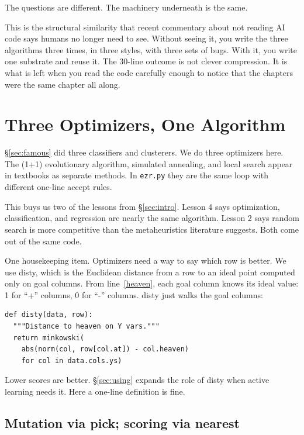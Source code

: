 \documentclass[AMA,STIX2COL]{WileyNJDv5}
\begin{document}
The questions are different. The machinery underneath is the
same.

This is the structural similarity that recent commentary about
not reading AI code says humans no longer need to see. Without
seeing it, you write the three algorithms three times, in three
styles, with three sets of bugs. With it, you write one
substrate and reuse it. The 30-line outcome is not clever
compression. It is what is left when you read the code
carefully enough to notice that the chapters were the same
chapter all along.

\section{Three Optimizers, One Algorithm}\label{sec:opt}

\S\ref{sec:famous} did three classifiers and clusterers. We do
three optimizers here. The (1+1) evolutionary algorithm,
simulated annealing, and local search appear in textbooks as
separate methods. In \texttt{ezr.py} they are the same loop
with different one-line accept rules.

This buys us two of the lessons from \S\ref{sec:intro}. Lesson 4
says optimization, classification, and regression are nearly the
same algorithm. Lesson 2 says random search is more competitive
than the metaheuristics literature suggests. Both come out of
the same code.

One housekeeping item. Optimizers need a way to say which row is
better. We use \textsf{disty}, which is the Euclidean distance
from a row to an ideal point computed only on goal columns. From
line~\ref{heaven}, each goal column knows its ideal value: 1 for
``+'' columns, 0 for ``-'' columns. \textsf{disty} just walks the
goal columns:

\begin{verbatim}
def disty(data, row):
  """Distance to heaven on Y vars."""
  return minkowski(
    abs(norm(col, row[col.at]) - col.heaven)
    for col in data.cols.ys)
\end{verbatim}

Lower scores are better. \S\ref{sec:using} expands the role of
\textsf{disty} when active learning needs it. Here a one-line
definition is fine.

\subsection{Mutation via \textsf{pick}; scoring via \textsf{nearest}}
\end{document}
